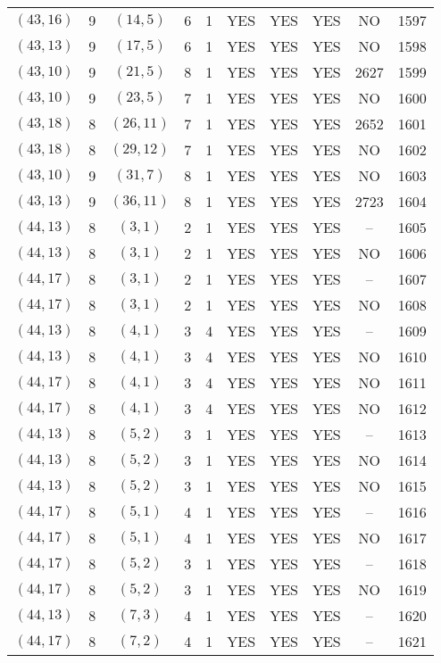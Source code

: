 \begin{longtable}{|c|c|c|c|c|c|c|c|c|c|}
$(43, 16)$ & 9 & $(14, 5)$ & 6 & 1 & YES & YES & YES & NO & 1597\\
$(43, 13)$ & 9 & $(17, 5)$ & 6 & 1 & YES & YES & YES & NO & 1598\\
$(43, 10)$ & 9 & $(21, 5)$ & 8 & 1 & YES & YES & YES & 2627 & 1599\\
$(43, 10)$ & 9 & $(23, 5)$ & 7 & 1 & YES & YES & YES & NO & 1600\\
$(43, 18)$ & 8 & $(26, 11)$ & 7 & 1 & YES & YES & YES & 2652 & 1601\\
$(43, 18)$ & 8 & $(29, 12)$ & 7 & 1 & YES & YES & YES & NO & 1602\\
$(43, 10)$ & 9 & $(31, 7)$ & 8 & 1 & YES & YES & YES & NO & 1603\\
$(43, 13)$ & 9 & $(36, 11)$ & 8 & 1 & YES & YES & YES & 2723 & 1604\\
$(44, 13)$ & 8 & $(3, 1)$ & 2 & 1 & YES & YES & YES & -- & 1605\\
$(44, 13)$ & 8 & $(3, 1)$ & 2 & 1 & YES & YES & YES & NO & 1606\\
$(44, 17)$ & 8 & $(3, 1)$ & 2 & 1 & YES & YES & YES & -- & 1607\\
$(44, 17)$ & 8 & $(3, 1)$ & 2 & 1 & YES & YES & YES & NO & 1608\\
$(44, 13)$ & 8 & $(4, 1)$ & 3 & 4 & YES & YES & YES & -- & 1609\\
$(44, 13)$ & 8 & $(4, 1)$ & 3 & 4 & YES & YES & YES & NO & 1610\\
$(44, 17)$ & 8 & $(4, 1)$ & 3 & 4 & YES & YES & YES & NO & 1611\\
$(44, 17)$ & 8 & $(4, 1)$ & 3 & 4 & YES & YES & YES & NO & 1612\\
$(44, 13)$ & 8 & $(5, 2)$ & 3 & 1 & YES & YES & YES & -- & 1613\\
$(44, 13)$ & 8 & $(5, 2)$ & 3 & 1 & YES & YES & YES & NO & 1614\\
$(44, 13)$ & 8 & $(5, 2)$ & 3 & 1 & YES & YES & YES & NO & 1615\\
$(44, 17)$ & 8 & $(5, 1)$ & 4 & 1 & YES & YES & YES & -- & 1616\\
$(44, 17)$ & 8 & $(5, 1)$ & 4 & 1 & YES & YES & YES & NO & 1617\\
$(44, 17)$ & 8 & $(5, 2)$ & 3 & 1 & YES & YES & YES & -- & 1618\\
$(44, 17)$ & 8 & $(5, 2)$ & 3 & 1 & YES & YES & YES & NO & 1619\\
$(44, 13)$ & 8 & $(7, 3)$ & 4 & 1 & YES & YES & YES & -- & 1620\\
$(44, 17)$ & 8 & $(7, 2)$ & 4 & 1 & YES & YES & YES & -- & 1621\\

\end{longtable}
